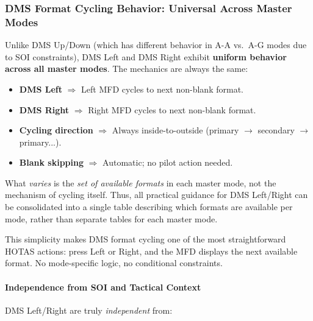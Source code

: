 \documentclass[11pt,a4paper]{article}
\begin{document}
\subsubsection{DMS Format Cycling Behavior: Universal Across Master Modes}
\label{sec:C4-S3-S3}

Unlike DMS Up/Down (which has different behavior in A-A vs.~A-G modes due to SOI constraints), DMS Left and DMS Right exhibit \textbf{uniform behavior across all master modes}. The mechanics are always the same:

\begin{itemize}

\item \textbf{DMS Left} $\Rightarrow$ Left MFD cycles to next non-blank format.

\item \textbf{DMS Right} $\Rightarrow$ Right MFD cycles to next non-blank format.

\item \textbf{Cycling direction} $\Rightarrow$ Always inside-to-outside (primary $\to$ secondary $\to$ primary...).

\item \textbf{Blank skipping} $\Rightarrow$ Automatic; no pilot action needed.

\end{itemize}

What \textit{varies} is the \textit{set of available formats} in each master mode, not the mechanism of cycling itself. Thus, all practical guidance for DMS Left/Right can be consolidated into a single table describing which formats are available per mode, rather than separate tables for each master mode.

This simplicity makes DMS format cycling one of the most straightforward HOTAS actions: press Left or Right, and the MFD displays the next available format. No mode-specific logic, no conditional constraints.

\paragraph*{Independence from SOI and Tactical Context}

DMS Left/Right are truly \textit{independent} from:
\end{document}
